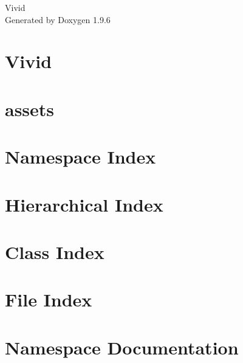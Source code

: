 \documentclass[twoside]{book}
\newcommand{\+}{\discretionary{\mbox{\scriptsize$\hookleftarrow$}}{}{}}
\newcommand{\clearemptydoublepage}{%
    \newpage{\pagestyle{empty}\cleardoublepage}%
  }
\begin{document}
  \raggedbottom
    \hypersetup{pageanchor=false,
                bookmarksnumbered=true,
                pdfencoding=unicode
               }
  \begin{titlepage}
  \vspace*{7cm}
  \begin{center}%
  {\Large Vivid}\\
  \vspace*{1cm}
  {\large Generated by Doxygen 1.9.6}\\
  \end{center}
  \end{titlepage}
  \clearemptydoublepage
  \tableofcontents
  \clearemptydoublepage
  \hypersetup{pageanchor=true}
\chapter{Vivid}
\label{index}\hypertarget{index}{}
\chapter{assets}
\label{md_src_editor_assets_assets}

\chapter{Namespace Index}

\chapter{Hierarchical Index}

\chapter{Class Index}

\chapter{File Index}

\chapter{Namespace Documentation}






\end{document}
